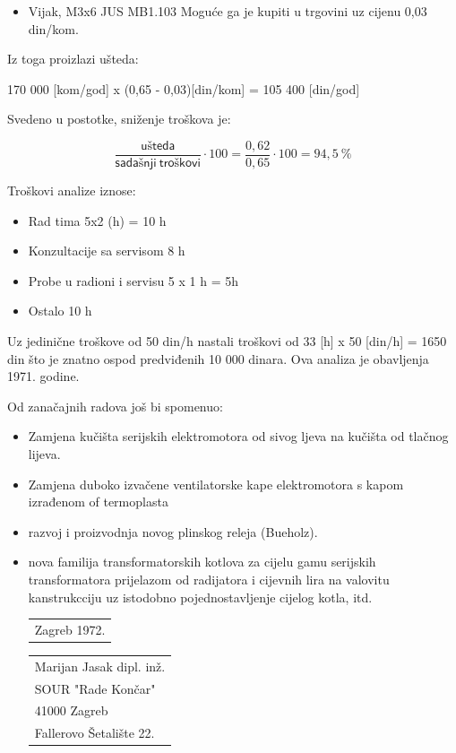 \documentclass[a4paper,12pt]{article}
\numberwithin{figure}{section}
\begin{document}
\begin{itemize}
\item Vijak, M3x6 JUS MB1.103 Moguće ga je kupiti u trgovini uz cijenu 0,03 din/kom.
\end{itemize}
\begin{figure}
  \vspace{-20pt}
  \begin{center}
    
  \end{center}

\end{figure}
\FloatBarrier
Iz toga proizlazi ušteda:
\begin{center}
170 000 [kom/god] x (0,65 - 0,03)[din/kom] = 105 400 [din/god]
\end{center}
Svedeno u postotke, sniženje troškova je:
\begin{center}
\begin{equation*}
\frac{\mathsf{ušteda}}{\mathsf{sadašnji\: troškovi}} \cdot 100 = \frac{0,62}{0,65} \cdot 100 = 94,5\:
\%
\end{equation*}
\end{center}
Troškovi analize iznose:
\begin{itemize}
\item Rad tima 5x2 (h) = 10 h
\item Konzultacije sa servisom 8 h
\item Probe u radioni i servisu 5 x 1 h = 5h
\item Ostalo 10 h
\end{itemize}
Uz jedinične troškove od 50 din/h nastali troškovi od 33 [h] x 50 [din/h] = 1650 din što je znatno ospod predviđenih 10 000 dinara. Ova analiza je obavljenja 1971. godine.\par
Od zanačajnih radova još bi spomenuo:
\begin{itemize}
\item Zamjena kučišta serijskih elektromotora od sivog ljeva na kučišta od tlačnog lijeva. 
\item Zamjena duboko izvačene ventilatorske kape elektromotora s kapom izrađenom of termoplasta
\item razvoj i proizvodnja novog plinskog releja (Bueholz).
\item nova familija transformatorskih kotlova za cijelu gamu serijskih transformatora prijelazom od radijatora i cijevnih lira na valovitu kanstrukcciju uz istodobno pojednostavljenje cijelog kotla, itd.\\


\vfill\noindent
\begin{tabular}[t]{@{}l} 
  Zagreb 1972.
\end{tabular}
\hfill%
\begin{tabular}[t]{l@{}}
Marijan Jasak dipl. inž.\\
SOUR "Rade Končar"\\
41000 Zagreb\\
Fallerovo Šetalište 22.
\end{tabular}

\end{itemize}
\end{document}
